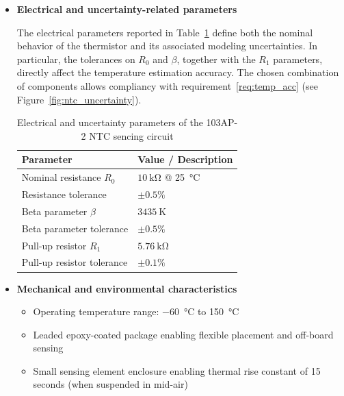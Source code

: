 \begin{itemize}

    \item \textbf{Electrical and uncertainty-related parameters}

        The electrical parameters reported in Table~\ref{tab:ntc_103ap2_params} define both the nominal behavior of the thermistor and its associated modeling uncertainties. In particular, the tolerances on $R_0$ and $\beta$, together with the $R_1$ parameters,  directly affect the temperature estimation accuracy. The chosen combination of components allows compliancy with requirement~\ref{req:temp_acc} (see Figure~\ref{fig:ntc_uncertainty}).

        \begin{table}[H]
            \centering
            \renewcommand{\arraystretch}{1.3}
            \caption{Electrical and uncertainty parameters of the 103AP-2 NTC sencing circuit}
            \label{tab:ntc_103ap2_params}

            \begin{tabular}{|l|l|}
                \hline
                \textbf{Parameter} & \textbf{Value / Description} \\
                \hline
                Nominal resistance $R_0$ & $\SI{10}{\kilo\ohm}$ @ \SI{25}{\celsius} \\
                \hline
                Resistance tolerance & $\pm 0.5\%$ \\
                \hline
                Beta parameter $\beta$ & $\SI{3435}{\kelvin}$ \\
                \hline
                Beta parameter tolerance & $\pm 0.5\%$ \\
                \hline
                Pull-up resistor $R_1$ & $\SI{5.76}{\kilo\ohm}$ \\
                \hline
                Pull-up resistor tolerance & $\pm 0.1\%$ \\
                \hline
            \end{tabular}
        \end{table}

    \item \textbf{Mechanical and environmental characteristics}
        \begin{itemize}
            \item Operating temperature range: \SI{-60}{\celsius} to \SI{150}{\celsius}
            \item Leaded epoxy-coated package enabling flexible placement and off-board sensing
            \item Small sensing element enclosure enabling thermal rise constant of 15 seconds (when suspended in mid-air)
        \end{itemize}


\end{itemize}

